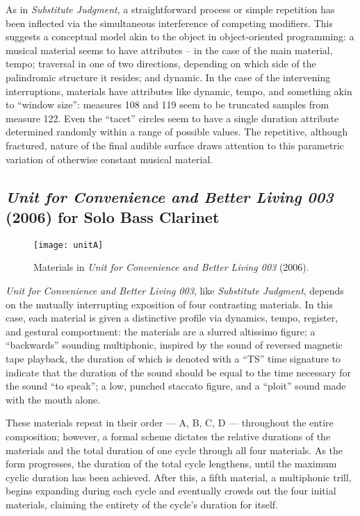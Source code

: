 As in \emph{Substitute Judgment}, a straightforward process or simple repetition has been inflected via the simultaneous interference of competing modifiers. This suggests a conceptual model akin to the object in object-oriented programming: a musical material seems to have attributes -- in the case of the main material, tempo; traversal in one of two directions, depending on which side of the palindromic structure it resides; and dynamic. In the case of the intervening interruptions, materials have attributes like dynamic, tempo, and something akin to ``window size'': measures 108 and 119 seem to be truncated samples from measure 122. Even the ``tacet'' circles seem to have a single duration attribute determined randomly within a range of possible values. The repetitive, although fractured, nature of the final audible surface draws attention to this parametric variation of otherwise constant musical material.

\subsection{\emph{Unit for Convenience and Better Living 003} (2006) for Solo Bass Clarinet}

\begin{figure}[H] 
\texttt{[image: unitA]}
\caption{Materials in \emph{Unit for Convenience and Better Living 003} (2006). } 
\end{figure}

\emph{Unit for Convenience and Better Living 003}, like \emph{Substitute Judgment}, depends on the mutually interrupting exposition of four contrasting materials. In this case, each material is given a distinctive profile via dynamics, tempo, register, and gestural comportment: the materials are a slurred altissimo figure; a ``backwards'' sounding multiphonic, inspired by the sound of reversed magnetic tape playback, the duration of which is denoted with a ``TS'' time signature to indicate that the duration of the sound should be equal to the time necessary for the sound ``to speak''; a low, punched staccato figure, and a ``ploit'' sound made with the mouth alone. 

These materials repeat in their order --- A, B, C, D --- throughout the entire composition; however, a formal scheme dictates the relative durations of the materials and the total duration of one cycle through all four materials. As the form progresses, the duration of the total cycle lengthens, until the maximum cyclic duration has been achieved. After this, a fifth material, a multiphonic trill, begins expanding during each cycle and eventually crowds out the four initial materials, claiming the entirety of the cycle's duration for itself.

